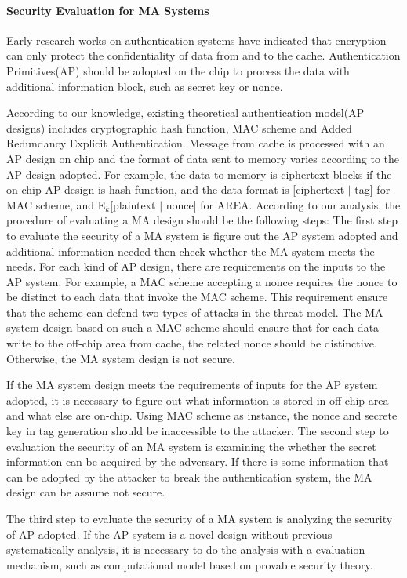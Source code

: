\documentclass{article}
\begin{document}
\paragraph{Security Evaluation for MA Systems}
Early research works on authentication systems have indicated that encryption can only protect the confidentiality of data from and to the cache. Authentication Primitives(AP) should be adopted on the chip to process the data with additional information block, such as secret key or nonce. 

According to our knowledge, existing theoretical authentication model(AP designs) includes cryptographic hash function, MAC scheme and Added Redundancy Explicit Authentication\cite{area}.
Message from cache is processed with an AP design on chip and the format of data sent to memory varies according to the AP design adopted. For example, the data to memory is ciphertext blocks if the on-chip AP design is hash function, and the data format is [ciphertext $\mid$ tag] for MAC scheme, and E$_k$[plaintext $\mid$ nonce] for AREA. According to our analysis, the procedure of evaluating a MA design should be the following steps:
The first step to evaluate the security of a MA system is figure out the AP system adopted and additional information needed then check whether the MA system meets the needs. 
For each kind of AP design, there are requirements on the inputs to the AP system. For example, a MAC scheme accepting a nonce requires the nonce to be distinct to each data that invoke the MAC scheme. This requirement ensure that the scheme can defend two types of attacks in the threat model. The MA system design based on such a MAC scheme should ensure that for each data write to the off-chip area from cache, the related nonce should be distinctive. Otherwise, the MA system design is not secure. 

If the MA system design meets the requirements of inputs for the AP system adopted, it is necessary to figure out what information is stored in off-chip area and what else are on-chip. Using MAC scheme as instance, the nonce and secrete key in tag generation should be inaccessible to the attacker.  
The second step to evaluation the security of an MA system is examining the whether the secret information can be acquired by the adversary. If there is some information that can be adopted by the attacker to break the authentication system, the MA design can be assume not secure.

The third step to evaluate the security of a MA system is analyzing the security of AP adopted. If the AP system is a novel design without previous systematically analysis, it is necessary to do the analysis with a evaluation mechanism, such as computational model based on provable security theory.
\end{document}
